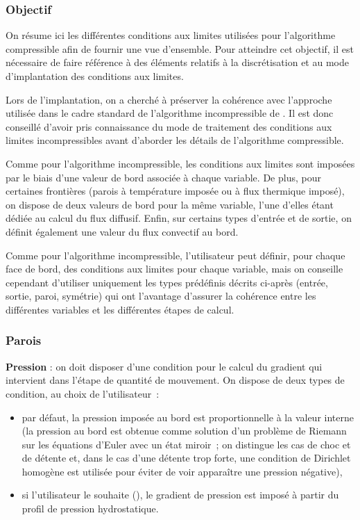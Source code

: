 \subsubsection*{Objectif}

On résume ici les différentes conditions aux limites utilisées pour l'algorithme
compressible afin de fournir une vue d'ensemble. Pour atteindre cet objectif,
il est nécessaire de faire référence à  des éléments relatifs
à la discrétisation et au mode d'implantation des conditions aux limites.

Lors de l'implantation, on a cherché à préserver la cohérence avec l'approche
utilisée dans le cadre standard de l'algorithme incompressible de \CS.
Il est donc conseillé d'avoir pris connaissance du mode de traitement des conditions
aux limites incompressibles avant d'aborder les détails de l'algorithme compressible.

Comme pour l'algorithme incompressible, les conditions aux limites sont imposées
par le biais d'une valeur de bord associée à chaque variable. De plus,
pour certaines
frontières (parois à température imposée ou à flux thermique imposé),
on dispose de deux valeurs de bord pour la même variable, l'une d'elles étant dédiée au calcul du
flux diffusif.
Enfin, sur certains types d'entrée et de sortie, on définit également
une valeur du flux convectif au bord.

Comme pour l'algorithme incompressible, l'utilisateur peut définir,
pour chaque face
de bord, des conditions aux limites pour chaque variable, mais on conseille cependant
d'utiliser uniquement les types prédéfinis
décrits ci-après (entrée,
sortie, paroi, symétrie) qui ont l'avantage d'assurer la cohérence entre
les différentes variables et les différentes étapes de calcul.


\subsubsection*{Parois}

{\bf Pression} : on doit disposer d'une condition pour le calcul du gradient
qui intervient dans l'étape de quantité de mouvement.
On dispose de deux types de condition, au choix de l'utilisateur~:
\begin{itemize}
\item par défaut, la pression imposée au bord est proportionnelle
à la valeur interne (la pression au bord est obtenue comme solution
d'un problème de Riemann sur les équations d'Euler
avec un état miroir~; on distingue les cas de choc et de
détente et, dans le cas d'une détente trop forte, une condition de
Dirichlet homogène est utilisée pour éviter de voir apparaître une
pression négative),
\item si l'utilisateur le souhaite (), le gradient de
pression est imposé à partir du profil de pression hydrostatique.
\end{itemize}
\bigskip

